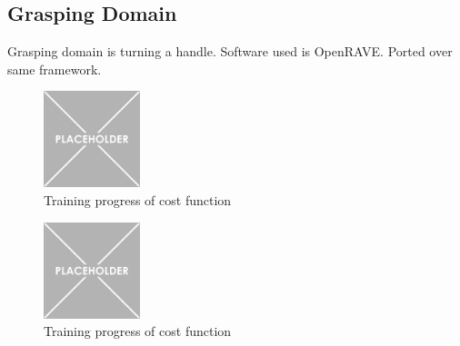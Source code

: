 \subsection{Grasping Domain}
Grasping domain is turning a handle.  Software used is OpenRAVE.  Ported over same framework.

\begin{figure}[h]
    \centering
    \includegraphics[width=0.25\textwidth]{Images/placeholder.png}
    \caption{Training progress of cost function}
    \label{fig:GraspingSyntheticTraningAccuracy}
\end{figure}

\begin{figure}[h]
    \centering
    \includegraphics[width=0.25\textwidth]{Images/placeholder.png}
    \caption{Training progress of cost function}
    \label{fig:GraspingCombininedTraningProgress}
\end{figure}